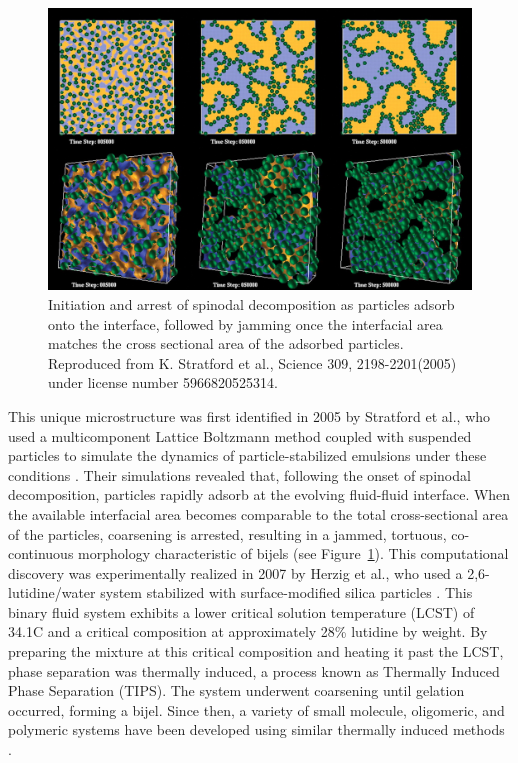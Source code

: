 \begin{figure}
    \centering
    \includegraphics[scale = 0.3]{figures/introduction/bijel_coarsening.jpg}
    \caption{Initiation and arrest of spinodal decomposition as particles adsorb onto the interface, followed by jamming once the 
    interfacial area matches the cross sectional area of the adsorbed particles\cite{stratford_colloidal_2005}. 
    Reproduced from K. Stratford et al., Science 309, 2198-2201(2005) under license number 5966820525314.}
    \label{fig:bijel_coarsen}
\end{figure}

This unique microstructure was first identified in 2005 by Stratford et al., who used a multicomponent Lattice Boltzmann method coupled with suspended particles to simulate the 
dynamics of particle-stabilized emulsions under these conditions \cite{stratford_colloidal_2005}. Their simulations revealed that, following the onset of spinodal decomposition, particles 
rapidly adsorb at the evolving fluid-fluid interface. When the available interfacial area becomes comparable to the total cross-sectional area of the particles, coarsening is arrested, 
resulting in a jammed, tortuous, co-continuous morphology characteristic of bijels (see Figure~\ref{fig:bijel_coarsen}).
This computational discovery was experimentally realized in 2007 by Herzig et al., who used a 2,6-lutidine/water system stabilized with surface-modified silica particles \cite{herzig_bicontinuous_2007}. 
This binary fluid system exhibits a lower critical solution temperature (LCST) of 34.1\textdegree C and a critical composition at approximately 28\% lutidine by weight. By preparing the mixture at this 
critical composition and heating it past the LCST, phase separation was thermally induced, a process known as Thermally Induced Phase Separation (TIPS). The system underwent coarsening until gelation 
occurred, forming a bijel. Since then, a variety of small molecule, oligomeric, and polymeric systems have been developed using similar thermally induced methods 
\cite{tavacoli_novel_2011, lee_bicontinuous_2010, bai_dynamics_2015, ching_rapid_2021}. 

